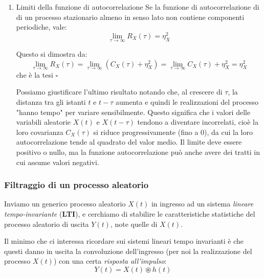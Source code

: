\documentclass[a4paper,11pt]{article}
\begin{document}
\begin{enumerate}
\item \begin{theorem}{Limiti della funzione di autocorrelazione}
Se la funzione di autocorrelazione di di un processo stazionario almeno in senso lato non contiene componenti periodiche, vale:
$$
\lim_{\tau \rightarrow \infty} R_X(\tau) = \eta_X^2
$$
\end{theorem}
Questo si dimostra da:
$$
\lim_{\tau \rightarrow \infty} R_X(\tau) = 
\lim_{\tau \rightarrow \infty} \left( C_X(\tau) + \eta_X^2 \right) = \lim_{\tau \rightarrow \infty} C_X(\tau) + \eta_X^2 = \eta_X^2
$$
che è la tesi \hfill $\square$

Possiamo giustificare l'ultimo risultato notando che, al crescere di $\tau$, la distanza tra gli istanti $t$ e $t - \tau$ aumenta e quindi le realizzazioni del processo "hanno tempo" per variare sensibilmente. Questo significa che i valori delle variabili aleatorie $X(t)$ e $X(t - \tau)$ tendono a diventare incorrelati, cioè la loro covarianza $C_X(\tau)$ si riduce progressivamente (fino a 0), da cui la loro autocorrelazione tende al quadrato del valor medio. Il limite deve essere positivo o nullo, ma la funzione autocorrelazione può anche avere dei tratti in cui assume valori negativi.
\end{enumerate}

\subsubsection{Filtraggio di un processo aleatorio}
Inviamo un generico processo aleatorio $X(t)$ in ingresso ad un sistema \textit{lineare tempo-invariante} (\textbf{LTI}), e cerchiamo di stabilire le caratteristiche statistiche del processo aleatorio di uscita $Y(t)$, note quelle di $X(t)$.

Il minimo che ci interessa ricordare sui sistemi lineari tempo invarianti è che questi danno in uscita la convoluzione dell'ingresso (per noi la realizzazione del processo $X(t)$) con una certa \textit{risposta all'impulso}:
$$
Y(t) = X(t) \circledast h(t)
$$
\end{document}
